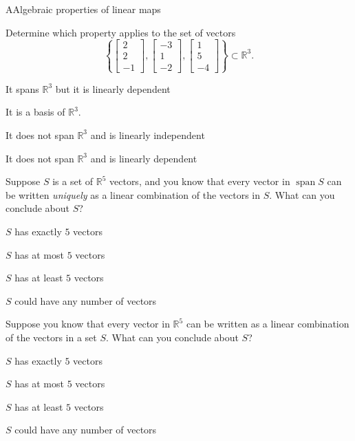 \documentclass{article}
\newcommand{\IR}{\mathbb{R}}
\newcommand{\vspan}{\operatorname{span}}
\begin{document}
\begin{module}{A}{Algebraic properties of linear maps}
\begin{readinessAssuranceTest}
\item Determine which property applies to the set of vectors $$\left\{ \begin{bmatrix}  2 \\ 2 \\ -1 \end{bmatrix}, \begin{bmatrix} -3 \\ 1 \\ -2 \end{bmatrix} , \begin{bmatrix} 1 \\ 5 \\ -4 \end{bmatrix}\right\}\subset \IR^3.$$
\begin{readinessAssuranceTestChoices}
\item It spans \(\IR^3\) but it is linearly dependent
\item It is a basis of $\IR^3$.
\item It does not span \(\IR^3\) and is linearly independent
\item It does not span \(\IR^3\) and is linearly dependent %
\end{readinessAssuranceTestChoices}


\item Suppose \(S\) is a set of \(\IR^5\) vectors, and you know that every vector in
      \(\vspan S\) can be written \textit{uniquely} as a linear combination of the vectors
      in \(S\).  What can you conclude about \(S\)?
\begin{readinessAssuranceTestChoices}
\item \(S\) has exactly \(5\) vectors 
\item \(S\) has at most \(5\) vectors %
\item \(S\) has at least \(5\) vectors
\item \(S\) could have any number of vectors
\end{readinessAssuranceTestChoices}

\item Suppose you know that every vector in \(\IR^5\) can be written as a linear combination of 
      the vectors in a set \(S\).  What can you conclude about \(S\)?
\begin{readinessAssuranceTestChoices}
\item \(S\) has exactly \(5\) vectors
\item \(S\) has at most \(5\) vectors
\item \(S\) has at least \(5\) vectors %
\item \(S\) could have any number of vectors
\end{readinessAssuranceTestChoices}


\end{readinessAssuranceTest}
\end{module}
\end{document}
